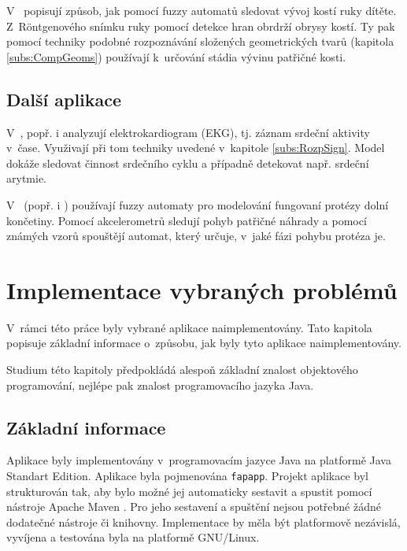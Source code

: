 V~\cite{PatPal-FuzGraSynRecSkeMatXra} popisují způsob, jak pomocí fuzzy automatů sledovat vývoj kostí ruky dítěte. Z~R\"{o}ntgenového snímku ruky pomocí detekce hran obrdrží obrysy kostí. Ty pak pomocí techniky podobné rozpoznávání složených geometrických tvarů (kapitola \ref{subs:CompGeoms}) používají k~určování stádia vývinu patřičné kosti.

\subsection{Další aplikace} \label{subs:BioMedRest}
V~\cite{PedGac-LeaFuzzAut}, popř. i \cite{RigTza-FuzAutFauDia} analyzují elektrokardiogram (EKG), tj. záznam srdeční aktivity v~čase. Využivají při tom techniky uvedené v~kapitole \ref{subs:RozpSign}. Model dokáže sledovat činnost srdečního cyklu a případně detekovat např. srdeční arytmie.


V~\cite{Alv-HumGaiModUsGenFuzFinStaMac} (popř. i \cite{AlvTri-ComModQuaPerSig})
používají fuzzy automaty pro modelování fungovaní protézy dolní končetiny. Pomocí akcelerometrů sledují pohyb patřičné náhrady a pomocí známých vzorů spouštějí automat, který určuje, v~jaké fázi pohybu protéza je.

\section{Implementace vybraných problémů}
V~rámci této práce byly vybrané aplikace naimplementovány. Tato kapitola popisuje základní informace o~způsobu, jak byly tyto aplikace naimplementovány.

Studium této kapitoly předpokládá alespoň základní znalost objektového programování, nejlépe pak znalost programovacího jazyka Java.

\subsection{Základní informace}
Aplikace byly implementovány v~programovacím jazyce Java na platformě Java Standart Edition. Aplikace byla pojmenována \verb|fapapp|. Projekt aplikace byl strukturován tak, aby bylo možné jej automaticky sestavit a spustit pomocí nástroje Apache Maven \cite{web-Maven}. Pro jeho sestavení a spuštění nejsou potřebné žádné dodatečné nástroje či knihovny. Implementace by měla být platformově nezávislá, vyvíjena a testována byla na platformě \mbox{GNU/Linux}.

